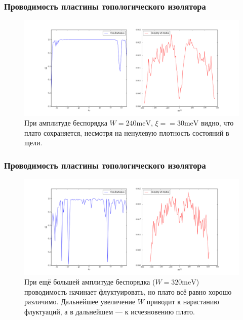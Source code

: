 \documentclass{beamer}
\begin{document}
\begin{frame}
    \frametitle{Проводимость пластины топологического изолятора}
    \begin{figure}[h]
        \centering
        \includegraphics[width=0.9\linewidth]{cond_and_density/dis_240.png}
        \caption{При амплитуде беспорядка $W = 240 \mathrm{meV}$, $\xi = =30\mathrm{meV}$
                 видно, что плато 
                 сохраняется, несмотря на ненулевую плотность состояний в щели.}
    \end{figure}
\end{frame}

\begin{frame}
    \frametitle{Проводимость пластины топологического изолятора}
    \begin{figure}[h]
        \centering
        \includegraphics[width=0.9\linewidth]{cond_and_density/dis_320.png}
        \caption{При ещё большей амплитуде беспорядка ($W = 320\mathrm{meV}$) 
                 проводимость начинает
                 флуктуировать, но плато всё равно хорошо различимо. Дальнейшее увеличение $W$ 
                 приводит к нарастанию флуктуаций, а в дальнейшем --- к исчезновению плато.}
    \end{figure}
\end{frame}
\end{document}
